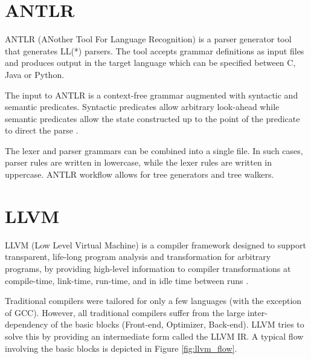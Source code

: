 \section{ANTLR \cite{ANTLR,ANTLR2}}

ANTLR (ANother Tool For Language Recognition) is a parser generator
tool that generates LL(*) parsers. The tool accepts grammar
definitions as input files and produces output in the target language
which can be specified between C, Java or Python.

The input to ANTLR is a context-free grammar augmented with syntactic
and semantic predicates. Syntactic predicates allow arbitrary look-ahead
while semantic predicates allow the state constructed up to the point of
the predicate to direct the parse \cite{ANTLR}.

The lexer and parser grammars can be combined into a single file.  In
such cases, parser rules are written in lowercase, while the lexer
rules are written in uppercase. ANTLR workflow allows for tree
generators and tree walkers.

\section{LLVM}

LLVM (Low Level Virtual Machine) is a compiler framework designed to
support transparent, life-long program analysis and transformation
for arbitrary programs, by providing high-level information to
compiler transformations at compile-time, link-time, run-time, and in
idle time between runs \cite{LLVM:CGO04}.

Traditional compilers were tailored for only a few languages (with the
exception of GCC). However, all traditional compilers suffer from the
large inter-dependency of the basic blocks (Front-end, Optimizer,
Back-end). LLVM tries to solve this by providing an intermediate form
called the LLVM IR. A typical flow involving the basic blocks is
depicted in Figure \ref{fig:llvm_flow}.

